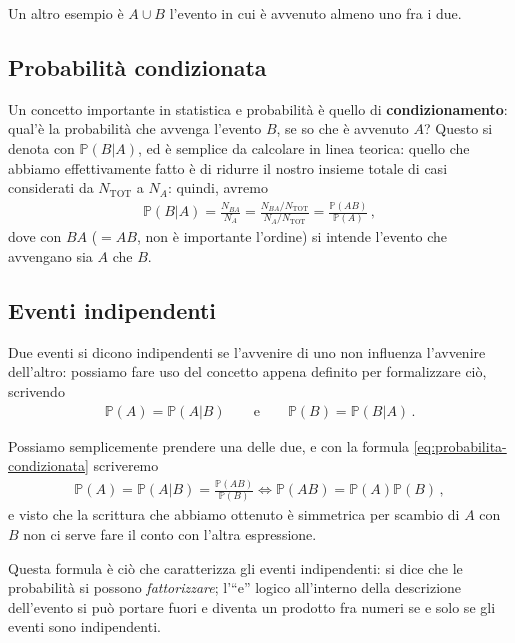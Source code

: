 \documentclass[a4paper,12pt]{article}
\begin{document}
Un altro esempio è \(A \cup B\) l'evento in cui è avvenuto almeno uno fra i due.

\subsection{Probabilità condizionata}

Un concetto importante in statistica e probabilità è quello di \textbf{condizionamento}: qual'è la probabilità che avvenga l'evento \(B\), se so che è avvenuto \(A\)? 
Questo si denota con \(\mathbb{P} (B | A)\), ed è semplice da calcolare in linea teorica: quello che abbiamo effettivamente fatto è di ridurre il nostro insieme totale di casi considerati da \(N _{\text{TOT}}\) a \(N_A\): quindi, avremo 
%
\begin{align} \label{eq:probabilita-condizionata}
\mathbb{P}(B | A) = \frac{N_{BA}}{N_A} = \frac{ N_{BA} / N _{\text{TOT}}}{N_A / N _{\text{TOT}}} = \frac{\mathbb{P}(AB)}{\mathbb{P}(A)}
\,,
\end{align}
%
dove con \(BA\) (\(= AB\), non è importante l'ordine) si intende l'evento che avvengano sia \(A\) che \(B\). 

\subsection{Eventi indipendenti}

Due eventi si dicono indipendenti se l'avvenire di uno non influenza l'avvenire dell'altro: possiamo fare uso del concetto appena definito per formalizzare ciò, scrivendo 
%
\begin{align}
\mathbb{P}(A) = \mathbb{P}(A | B) 
\qquad \text{e} \qquad
\mathbb{P}(B) = \mathbb{P}(B | A) 
\,.
\end{align}

Possiamo semplicemente prendere una delle due, e con la formula \eqref{eq:probabilita-condizionata} scriveremo 
%
\begin{align} \label{eq:probabilita-indipenenti}
\mathbb{P}(A) = \mathbb{P}(A | B) = \frac{\mathbb{P}(AB)}{\mathbb{P}(B)}
\iff
\mathbb{P}(AB) = \mathbb{P}(A) \mathbb{P}(B)
\,,
\end{align}
%
e visto che la scrittura che abbiamo ottenuto è simmetrica per scambio di \(A\) con \(B\) non ci serve fare il conto con l'altra espressione.

Questa formula è ciò che caratterizza gli eventi indipendenti: si dice che le probabilità si possono \emph{fattorizzare}; l'``e'' logico all'interno della descrizione dell'evento si può portare fuori e diventa un prodotto fra numeri se e solo se gli eventi sono indipendenti.
\end{document}
